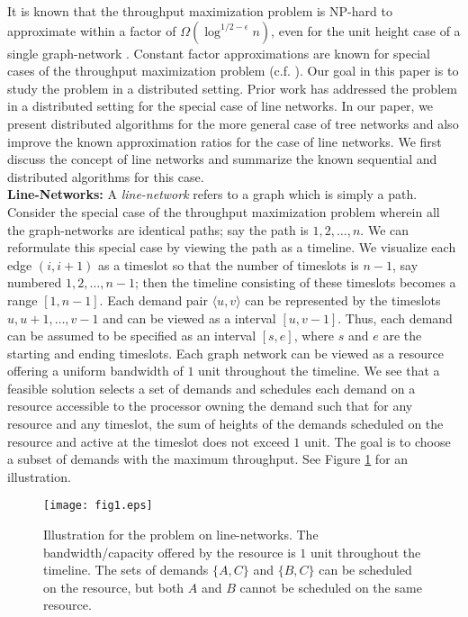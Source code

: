 \documentclass[11pt]{article}
\newcommand{\pair}[2] {\langle #1,#2 \rangle}
\begin{document}
It is known that the throughput maximization problem is 
NP-hard to approximate within a factor of $\Omega(\log^{1/2-\epsilon} n)$, even for the unit height case of a 
single graph-network \cite{EDP-Hardness}.
Constant factor approximations are known for special cases of the throughput maximization problem (c.f. \cite{AmitKumar}).
Our goal in this paper is to study the problem in a distributed setting.
Prior work has addressed the problem in a distributed setting for the special case of line networks.
In our paper, we present distributed algorithms for the more general case of tree networks
and also improve the known approximation ratios for the case of line networks.
We first discuss the concept of line networks and summarize the known sequential and distributed algorithms
for this case. \\

\noindent
{\bf Line-Networks:} A {\em line-network} refers to a graph which is simply a path.
Consider the special case of the throughput maximization problem
wherein all the graph-networks are identical paths; say the path is $1,2,\ldots, n$.
We can reformulate this special case by viewing the path as a timeline.
We visualize each edge $(i,i+1)$ as a timeslot so that the number of timeslots
is $n-1$, say numbered $1,2,\ldots,n-1$; then the timeline consisting of these
timeslots becomes a range $[1,n-1]$.
Each demand pair $\pair{u}{v}$ can be represented by the timeslots $u,u+1, \ldots,v-1$
and can be viewed as a interval $[u,v-1]$. 
Thus, each demand can be assumed to be specified as an interval $[s,e]$,
where $s$ and $e$ are the starting and ending timeslots.
Each graph network can be viewed as a resource offering a uniform bandwidth of $1$ unit
throughout the timeline. We see that a feasible solution selects a set of 
demands and schedules each demand on a resource accessible to the processor owning
the demand such that for any resource and any timeslot, 
the sum of heights of the demands scheduled on the resource and active at the timeslot
does not exceed $1$ unit. The goal is to choose a subset of demands with the maximum throughput.
See Figure \ref{fig:1} for an illustration.

\begin{figure}
\centering
\texttt{[image: fig1.eps]}
\caption{Illustration for the problem on line-networks. 
The bandwidth/capacity offered by the resource is $1$ unit throughout the timeline. 
The sets of demands $\{A,C\}$ and $\{B,C\}$ can be scheduled
on the resource, but both $A$ and $B$ cannot be scheduled on the same resource.
}
\label{fig:1}
\end{figure}
\end{document}
